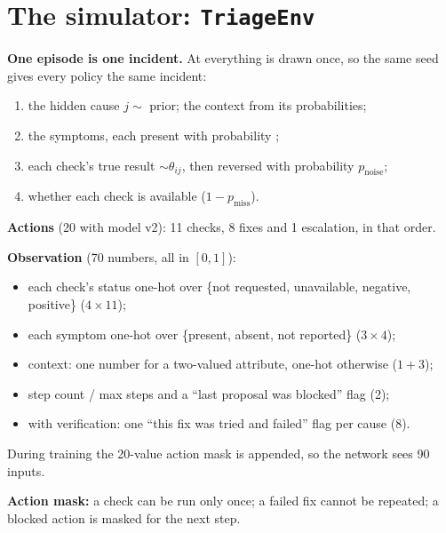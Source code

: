 \documentclass[11pt,a4paper]{article}
\newcommand{\code}[1]{\path{#1}}
\begin{document}
\section{The simulator: \texorpdfstring{\texttt{TriageEnv}}{TriageEnv}}

\textbf{One episode is one incident.} At \code{reset(seed)} everything is drawn once, so the same
seed gives every policy the same incident:
\begin{enumerate}
  \item the hidden cause $j \sim$ prior; the context from its probabilities;
  \item the symptoms, each present with probability \code{symptom_theta[i, j]};
  \item each check's true result $\sim \theta_{ij}$, then reversed with probability $p_{\text{noise}}$;
  \item whether each check is available ($1-p_{\text{miss}}$).
\end{enumerate}

\textbf{Actions} (20 with model v2): 11 checks, 8 fixes and 1 escalation, in that order.

\textbf{Observation} (70 numbers, all in $[0,1]$):
\begin{itemize}
  \item each check's status one-hot over \{not requested, unavailable, negative, positive\} ($4\times11$);
  \item each symptom one-hot over \{present, absent, not reported\} ($3\times4$);
  \item context: one number for a two-valued attribute, one-hot otherwise ($1+3$);
  \item step count / max steps and a ``last proposal was blocked'' flag (2);
  \item with verification: one ``this fix was tried and failed'' flag per cause (8).
\end{itemize}
During training the 20-value action mask is appended, so the network sees 90 inputs.

\textbf{Action mask:} a check can be run only once; a failed fix cannot be repeated; a blocked
action is masked for the next step.
\end{document}
